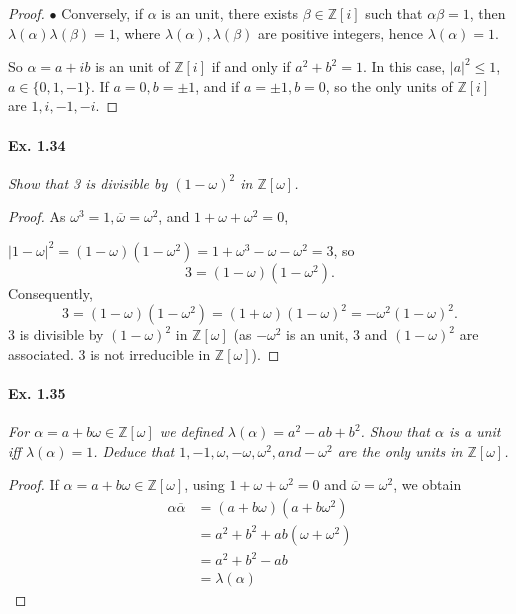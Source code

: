 \documentclass[11pt,a4paper]{article}
\newcommand{\Z}{\mathbb{Z}}
\begin{document}
{\begin{proof}
$\bullet$  Conversely, if $\alpha$ is an unit, there exists $\beta \in \Z[i]$ such that $\alpha \beta = 1$, then $\lambda( \alpha) \lambda(\beta) = 1$, where $\lambda(\alpha), \lambda(\beta)$ are positive integers, hence $\lambda(\alpha) = 1$.

So $\alpha = a + ib$ is an unit of $\Z[i]$ if and only if $a^2+b^2 = 1$. In this case, $\vert a \vert^2\leq 1$, $a \in \{ 0,1,-1\}$. If $a = 0, b = \pm 1$, and if $a = \pm 1, b = 0$, so the only units of $\Z[i]$ are $1,i,-1,-i$.
\end{proof}

\paragraph{Ex. 1.34}
{\it Show that 3 is divisible by $(1 - \omega)^2$ in $\Z[\omega]$.
}

\begin{proof}
As $\omega^3 = 1, \overline{\omega} = \omega^2$, and $1+\omega + \omega^2 = 0$,

$\vert 1-\omega \vert^2 = (1-\omega)(1-\omega^2) = 1 +\omega^3 - \omega -\omega^2 = 3$, so
$$3 = (1-\omega)(1-\omega^2).$$
Consequently, 
$$3 = (1-\omega) (1-\omega^2) =(1+\omega)(1-\omega)^2=  -\omega^2(1-\omega)^2.$$
3  is divisible by $(1 - \omega)^2$ in $\Z[\omega]$ (as $-\omega^2$ is an unit, $3$ and  $(1-\omega)^2$ are associated. $3$ is not irreducible in $\Z[\omega]$).
\end{proof}

\paragraph{Ex. 1.35}

{\it For $\alpha = a + b\omega \in \Z[\omega]$ we defined
$\lambda(\alpha) = a^2 - ab + b^2$. Show that $\alpha$ is a unit iff
$\lambda(\alpha) = 1$. Deduce that $1, -1, \omega, -\omega, \omega^2 ,
and -\omega^2$ are the only units in $\Z[\omega]$.
}

\begin{proof}
If $\alpha = a + b\omega \in \Z[\omega]$, using $1+\omega+ \omega^2=0$ and $\overline{\omega} = \omega^2$, we obtain
\begin{align*}
\alpha \overline{\alpha} &=(a+b \omega)(a+b \omega^2)\\
&= a^2 + b^2 +ab(\omega + \omega^2)\\
&= a^2+b^2-ab\\
&=\lambda(\alpha)
\end{align*}


\end{proof}}
\end{document}
